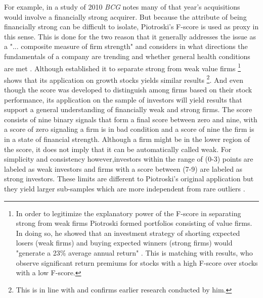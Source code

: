 \documentclass[12pt]{article}
\begin{document}
For example, in a study of 2010 \emph{BCG} notes many of that year's acquisitions would involve a financially strong acquirer. But because the attribute of being financially strong can be difficult to isolate, Piotroski's F-score is used as proxy in this sense. This is done for the two reason that it generally addresses the issue as a "... composite measure of firm strength" \citep[p. 496]{Fama2006} and considers in what directions the fundamentals of a company are trending and whether general health conditions are met \citep[p.5]{Mohr2012}. Although \citet{Piotroski2000} established it to separate strong from weak value firms
	\footnote{In order to legitimize the explanatory power of the F-score in separating strong from weak firms Piotroski formed portfolios consisting of value firms. In doing so, he showed that an investment strategy of shorting expected losers (weak firms) and buying expected winners (strong firms) would "generate a 23\% average annual return" \citep[p. 4]{Piotroski2000}. This is matching with \citet{Hyde2014} results, who observe significant return premiums for stocks with a high F-score over stocks with a low F-score.}
\citet{Mohr2012} shows that its application on growth stocks yields similar results
	\footnote{This is in line with \citet{Piotroski2000} and confirms earlier research conducted by him.}.
And even though the score was developed to distinguish among firms based on their stock performance, its application on the sample of investors will yield results that support a general understanding of financially weak and strong firms. The score consists of nine binary signals that form a final score between zero and nine, with a score of zero signaling a firm is in bad condition and a score of nine the firm is in a state of financial strength. 
Although a firm might be in the lower region of the score, it does not imply that it can be automatically called weak. For simplicity and consistency however,investors within the range of (0-3) points are labeled as weak investors and firms with a score between (7-9) are labeled as strong investors. These limits are different to Piotroski's original application but they yield larger sub-samples which are more independent from rare outliers \citep[p.12]{Mohr2012}.
\end{document}
